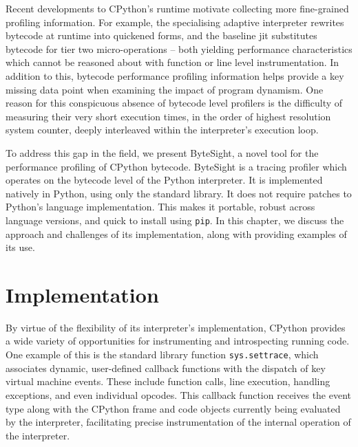 
Recent developments to CPython's runtime motivate collecting more fine-grained profiling information.
For example, the specialising adaptive interpreter rewrites bytecode at runtime into quickened forms, and the baseline \ac{jit} substitutes bytecode for tier two micro-operations -- both yielding performance characteristics which cannot be reasoned about with function or line level instrumentation.
In addition to this, bytecode performance profiling information helps provide a key missing data point when examining the impact of program dynamism.
One reason for this conspicuous absence of bytecode level profilers is the difficulty of measuring their very short execution times, in the order of highest resolution system counter, deeply interleaved within the interpreter's execution loop.

To address this gap in the field, we present ByteSight, a novel tool for the performance profiling of CPython bytecode.
ByteSight is a tracing profiler which operates on the bytecode level of the Python interpreter. It is implemented natively in Python, using only the standard library. It does not require patches to Python's language implementation. This makes it portable, robust across language versions, and quick to install using \texttt{pip}.
In this chapter, we discuss the approach and challenges of its implementation, along with providing examples of its use.


\section{Implementation}
\label{sec:profiling-bytecode-implementation}

By virtue of the flexibility of its interpreter's implementation, CPython provides a wide variety of opportunities for instrumenting and introspecting running code.
One example of this is the standard library function \texttt{sys.settrace}, which associates dynamic, user-defined callback functions with the dispatch of key virtual machine events. These include function calls, line execution, handling exceptions, and even individual opcodes.
This callback function receives the event type along with the CPython frame and code objects currently being evaluated by the interpreter, facilitating precise instrumentation of the internal operation of the interpreter.

